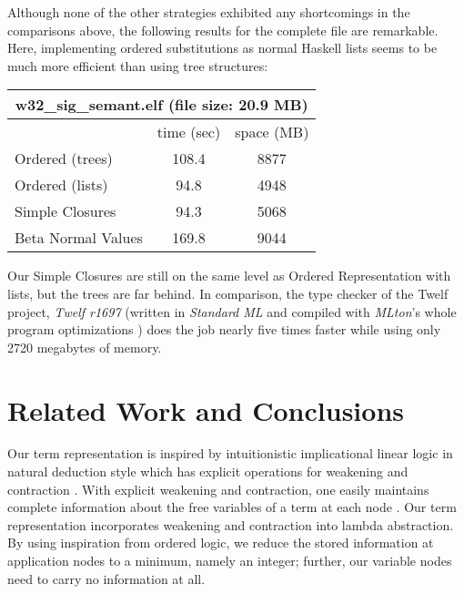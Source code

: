 \documentclass[submission,copyright,creativecommons]{eptcs}
\begin{document}
Although none of the other strategies exhibited any shortcomings in the comparisons above, the following results for the complete file are remarkable. Here, implementing ordered substitutions as normal Haskell lists seems to be much more efficient than using tree structures: 

\begin{center}
 \begin{tabular}{| l || c | c |}
\multicolumn{3}{c}{\textsf{w32\_sig\_semant.elf} (file size: 20.9 MB)}\\
\hline
& time (sec) & space (MB) \\
\hline
\hline
Ordered (trees) & 108.4 & 8877\\
\hline
Ordered (lists) & 94.8 & 4948\\ %
\hline
Simple Closures & 94.3 & 5068 \\ %
\hline
Beta Normal Values & 169.8 & 9044  \\
\hline
\end{tabular}
\end{center}

Our Simple Closures are still on the same level as Ordered Representation with lists, but the trees are far behind. 
In comparison, the type checker of the Twelf project, \emph{Twelf
  r1697} (written in \emph{Standard ML} and compiled with
\emph{MLton}'s whole program optimizations \cite{fluetWeeks:icfp01}) 
does the job nearly five
times faster while using only 2720 megabytes of
memory. %





\section{Related Work and Conclusions}
\label{sec:concl}

Our term representation is inspired by intuitionistic implicational
linear logic in natural deduction style which has explicit operations
for weakening and contraction
\cite{bentonBiermanDePaivaHyland:tlca93}.  With explicit weakening and
contraction, one easily maintains complete information about the free
variables of a term at each node \cite{kesnerLengrand:infcomp07}.  Our
term representation incorporates weakening and contraction into lambda
abstraction.  By using inspiration from ordered logic, we reduce the
stored information at application nodes to a minimum, namely an
integer; further, our variable nodes need to carry no information at all.
\end{document}
